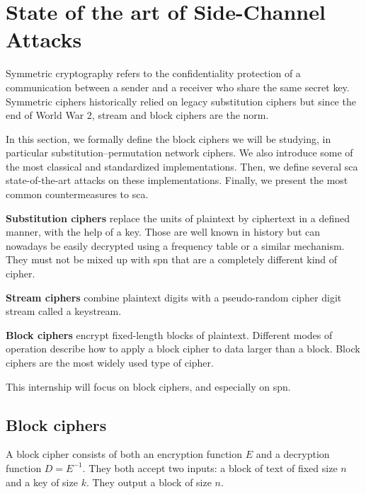 \documentclass[11pt]{sdm}
\begin{document}


\section{State of the art of Side-Channel Attacks}

Symmetric cryptography refers to the confidentiality protection of a communication between a sender and a receiver who share the same secret key.
Symmetric ciphers historically relied on legacy substitution ciphers but since the end of World War 2, stream and block ciphers are the norm.

In this section, we formally define the block ciphers we will be studying, in particular substitution–permutation network ciphers.
We also introduce some of the most classical and standardized implementations.
Then, we define several \acrlong{sca} state-of-the-art attacks on these implementations.
Finally, we present the most common countermeasures to \gls{sca}. 

\textbf{Substitution ciphers} replace the units of plaintext by ciphertext in a defined manner, with the help of a key.
Those are well known in history but can nowadays be easily decrypted using a frequency table or a similar mechanism.
They must not be mixed up with \acrlong{spn} that are a completely different kind of cipher.

\textbf{Stream ciphers} combine plaintext digits with a pseudo-random cipher digit stream called a keystream.

\textbf{Block ciphers} encrypt fixed-length blocks of plaintext.
Different modes of operation describe how to apply a block cipher to data larger than a block.
Block ciphers are the most widely used type of cipher.

This internship will focus on block ciphers, and especially on \acrlong{spn}.

\subsection{Block ciphers}

A block cipher consists of both an encryption function $E$ and a decryption function $D=E^{-1}$.
They both accept two inputs: a block of text of fixed size $n$ and a key of size $k$.
They output a block of size $n$.
\end{document}

